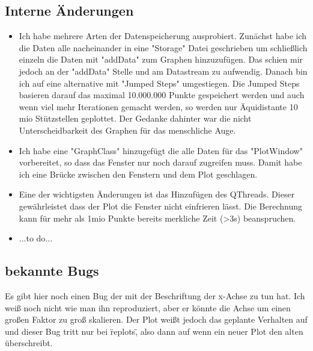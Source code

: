 \documentclass{article}
\begin{document}
\subsection{Interne Änderungen}
\begin{itemize}
\item Ich habe mehrere Arten der Datenspeicherung ausprobiert. Zunächst habe ich die Daten alle nacheinander in eine "{}Storage"{} Datei geschrieben um schließlich einzeln die Daten mit "{}addData"{} zum Graphen hinzuzufügen. Das schien mir jedoch an der "{}addData"{} Stelle und am Datastream zu aufwendig.  
Danach bin ich auf eine alternative mit "{}Jumped Steps"{} umgestiegen. Die Jumped Steps basieren darauf das maximal 10.000.000 Punkte gespeichert werden und auch wenn viel mehr Iterationen gemacht werden, so werden nur Äquidistante 10 mio Stützstellen geplottet. Der Gedanke dahinter war die nicht Unterscheidbarkeit des Graphen für das menschliche Auge.
\item Ich habe eine "{}GraphClass"{} hinzugefügt die alle Daten für das "{}PlotWindow"{} vorbereitet, so dass das Fenster nur noch darauf zugreifen muss. Damit habe ich eine Brücke zwischen den Fenstern und dem Plot geschlagen.
\item Eine der wichtigsten Änderungen ist das Hinzufügen des QThreads. Dieser gewährleistet dass der Plot die Fenster nicht einfrieren lässt. Die Berechnung kann für mehr als 1mio Punkte bereits merkliche Zeit (>3s) beanspruchen.
\item ...to do...
\end{itemize}

\subsection{bekannte Bugs}
Es gibt hier noch einen Bug der mit der Beschriftung der x-Achse zu tun hat. Ich weiß noch nicht wie man ihn reproduziert, aber er könnte die Achse um einen großen Faktor zu groß skalieren. Der Plot weißt jedoch das geplante Verhalten auf und dieser Bug tritt nur bei \"replots\", also dann auf wenn ein neuer Plot den alten überschreibt.

\newpage
\end{document}
